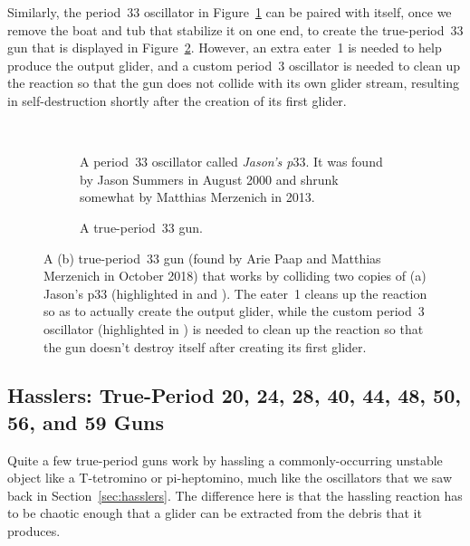 Similarly, the period~$33$ oscillator in Figure~\ref{fig:jasons_p33} can be paired with itself, once we remove the boat and tub that stabilize it on one end, to create the true-period~$33$ gun that is displayed in Figure~\ref{fig:p33_gun}. However, an extra eater~1 is needed to help produce the output glider, and a custom period~$3$ oscillator is needed to clean up the reaction so that the gun does not collide with its own glider stream, resulting in self-destruction shortly after the creation of its first glider.

\begin{figure}[!htb]
	\centering
	${}$ \ \begin{subfigure}{0.46\textwidth}
		\centering
		\caption{A period~$33$ oscillator called \emph{Jason's p$33$}. It was found by Jason Summers in August 2000 and shrunk somewhat by Matthias Merzenich in 2013.}\label{fig:jasons_p33}
	\end{subfigure} \hfill \begin{subfigure}{0.49\textwidth}
		\centering
		\caption{A true-period~$33$ gun.}\label{fig:p33_gun}
	\end{subfigure}
	\caption{A (b) true-period~$33$ gun (found by Arie Paap and Matthias Merzenich in October 2018) that works by colliding two copies of (a) Jason's p$33$ (highlighted in  and ). The eater~1 cleans up the reaction so as to actually create the output glider, while the custom period~$3$ oscillator (highlighted in ) is needed to clean up the reaction so that the gun doesn't destroy itself after creating its first glider.}\label{fig:p33_gun_both}
\end{figure}


\subsection{Hasslers: True-Period 20, 24, 28, 40, 44, 48, 50, 56, and 59 Guns}\label{sec:true_period_hassler}

Quite a few true-period guns work by hassling a commonly-occurring unstable object like a T-tetromino or pi-heptomino, much like the oscillators that we saw back in Section~\ref{sec:hasslers}. The difference here is that the hassling reaction has to be chaotic enough that a glider can be extracted from the debris that it produces.


